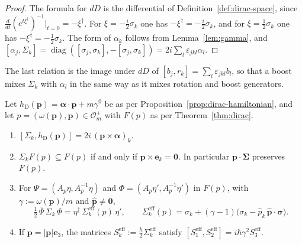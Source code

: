 \begin{proof}
	The formula for $dD$ is the differential of Definition~\ref{def:dirac-space}, since $\frac{d}{dt}(e^{t\xi^\dagger})^{-1}|_{t=0}=-\xi^\dagger$. For $\xi=-\frac i2\sigma_k$ one has $-\xi^\dagger=-\frac i2\sigma_k$, and for $\xi=\frac12\sigma_k$ one has $-\xi^\dagger=-\frac12\sigma_k$. The form of $\alpha_k$ follows from Lemma~\ref{lem:gamma}, and $[\alpha_j,\Sigma_k]=\operatorname{diag}([\sigma_j,\sigma_k],-[\sigma_j,\sigma_k])=2i\sum_l\varepsilon_{jkl}\alpha_l$.
\end{proof}

\noindent The last relation is the image under $dD$ of $[b_j,r_k]=\sum_l\varepsilon_{jkl}b_l$, so that a boost mixes $\Sigma_k$ with $\alpha_l$ in the same way as it mixes rotation and boost generators.

\begin{proposition}\label{prop:dirac-spin}
	Let $h_{\mathrm{D}}(\mathbf{p})=\boldsymbol{\alpha}\cdot\mathbf{p}+m\gamma^0$ be as per Proposition~\ref{prop:dirac-hamiltonian}, and let $p=(\omega(\mathbf{p}),\mathbf{p})\in\mathcal{O}_m^+$ with $F(p)$ as per Theorem~\ref{thm:dirac}.
	\begin{enumerate}
		\item $[\Sigma_k,h_{\mathrm{D}}(\mathbf{p})]=2i\,(\mathbf{p}\times\boldsymbol{\alpha})_k$.
		\item $\Sigma_kF(p)\subseteq F(p)$ if and only if $\mathbf{p}\times\mathbf{e}_k=\mathbf{0}$. In particular $\mathbf{p}\cdot\boldsymbol{\Sigma}$ preserves $F(p)$.
		\item For $\Psi=(A_p\eta,A_p^{-1}\eta)$ and $\Phi=(A_p\eta',A_p^{-1}\eta')$ in $F(p)$, with $\gamma:=\omega(\mathbf{p})/m$ and $\hat{\mathbf{p}}\neq\mathbf{0}$,
		\begin{equation}\label{eq:dirac-spin-effective}
			\tfrac12\,\bar\Psi\,\Sigma_k\,\Phi=\eta^\dagger\,\Sigma^{\mathrm{eff}}_k(p)\,\eta',\qquad \Sigma^{\mathrm{eff}}_k(p)=\sigma_k+(\gamma-1)\big(\sigma_k-\hat p_k\,\hat{\mathbf{p}}\cdot\boldsymbol{\sigma}\big).
		\end{equation}
		\item If $\mathbf{p}=|\mathbf{p}|\mathbf{e}_3$, the matrices $S^{\mathrm{eff}}_k:=\frac\hbar2\Sigma^{\mathrm{eff}}_k$ satisfy $[S^{\mathrm{eff}}_1,S^{\mathrm{eff}}_2]=i\hbar\gamma^2S^{\mathrm{eff}}_3$.
	\end{enumerate}
\end{proposition}

